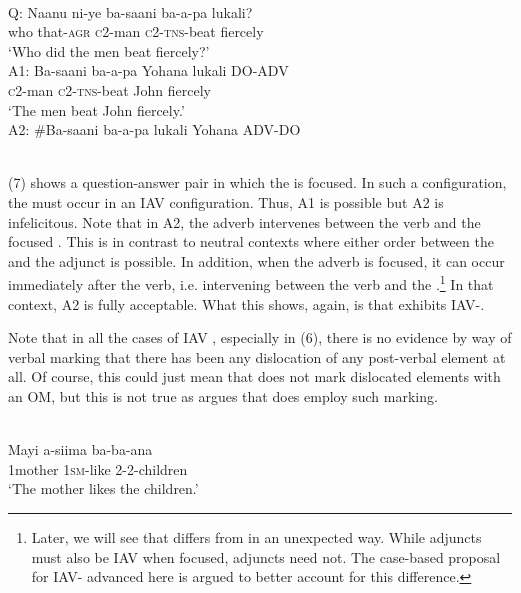 \documentclass[output=paper,newtxmath,modfonts,nonflat,draft]{langsci/langscibook}
\begin{document}
\ea\label{ex:selvanathan:7}
\\

Q: \gll Naanu  ni-ye    ba-saani   ba-a-pa     lukali?\\
who  that-\textsc{agr}   \textsc{c}2-man   \textsc{c}2-\textsc{tns}{}-beat  fiercely\\

\glt \-\hspace{0.5cm}`Who did the men beat fiercely?'\\

A1: \gll Ba-saani  ba-a-pa  Yohana      lukali DO-ADV\\
	\textsc{c}2-man   \textsc{c}2-\textsc{tns}{}-beat  John          fiercely\\
\glt \-\hspace{0.5cm}`The men beat John fiercely.'\\

A2: \gll \#Ba-saani  ba-a-pa  lukali        Yohana ADV-DO \\
	\\
\z

(7) shows a question-answer pair in which the  is focused. In such a configuration, the  must occur in an IAV configuration. Thus, A1 is possible but A2 is infelicitous. Note that in A2, the adverb intervenes between the verb and the focused . This is in contrast to neutral contexts where either order between the  and the adjunct is possible. In addition, when the adverb is focused, it can occur immediately after the verb, i.e. intervening between the verb and the .\footnote{Later, we will see that  differs from  in an unexpected way. While  adjuncts must also be IAV when focused,  adjuncts need not. The case-based proposal for IAV- advanced here is argued to better account for this difference.}  In that context, A2 is fully acceptable. What this shows, again, is that  exhibits IAV-.

Note that in all the cases of IAV , especially in (6), there is no evidence by way of verbal marking that there has been any dislocation of any post-verbal element at all. Of course, this could just mean that  does not mark dislocated elements with an OM, but this is not true as \citet{Sikuku2012} argues that  does employ such marking.

\ea\label{ex:selvanathan:8}
 \citep[8]{Sikuku2012}\\
\ea\label{ex:selvanathan:8a}
\gll Mayi     a-siima   ba-ba-ana\\
1mother   \textsc{1sm}{}-like   2-2-children \\
\glt `The mother likes the children.' \\
\end{document}
